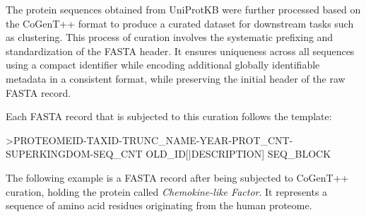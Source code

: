 The protein sequences obtained from UniProtKB were further processed based on
the CoGenT++ \cite{cogent0, cogent1} format to produce a curated dataset for
downstream tasks such as clustering. This process of curation involves the
systematic prefixing and standardization of the FASTA header. It ensures
uniqueness across all sequences using a compact identifier while encoding
additional globally identifiable metadata in a consistent format, while
preserving the initial header of the raw FASTA record.

Each FASTA record that is subjected to this curation follows the template:

\begin{plaintext}
>PROTEOMEID-TAXID-TRUNC_NAME-YEAR-PROT_CNT-SUPERKINGDOM-SEQ_CNT OLD_ID[|DESCRIPTION]
SEQ_BLOCK
\end{plaintext}

The following example is a FASTA record after being subjected to CoGenT++
curation, holding the protein called \textit{Chemokine-like Factor}. It
represents a sequence of amino acid residues originating from the human
proteome.

